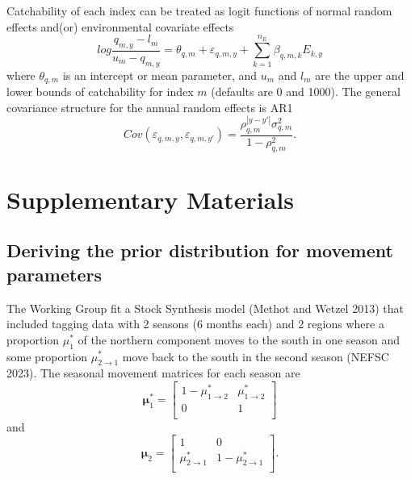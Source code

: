 \documentclass[
]{article}
\begin{document}
Catchability of each index can be treated as logit functions of normal random effects and(or) environmental covariate effects
\begin{equation*}
log \frac{q_{m,y}-l_m}{u_m-q_{m,y}} = \theta_{q,m} + \varepsilon_{q,m,y}  + \sum^{n_E}_{k=1} \beta_{q,m,k} E_{k,y}
\end{equation*}
where \(\theta_{q,m}\) is an intercept or mean parameter, and \(u_{m}\) and \(l_{m}\) are the upper and lower bounds of catchability for index \(m\) (defaults are 0 and 1000). The general covariance structure for the annual random effects is AR1
\begin{equation*}
Cov\left(\varepsilon_{q,m,y},\varepsilon_{q,m,y'}\right) =   \frac{\rho_{q,m}^{|y-y'|}\sigma^2_{q,m}}{1 - \rho_{q,m}^2}.
\end{equation*}

\pagebreak

\hypertarget{supplementary-materials}{%
\section*{Supplementary Materials}\label{supplementary-materials}}

\hypertarget{deriving-the-prior-distribution-for-movement-parameters}{%
\subsection*{Deriving the prior distribution for movement parameters}\label{deriving-the-prior-distribution-for-movement-parameters}}

The Working Group fit a Stock Synthesis model (Methot and Wetzel 2013) that included tagging data with 2 seasons (6 months each) and 2 regions where a proportion \(\mu^*_1\) of the northern component moves to the south in one season and some proportion \(\mu^*_{2\rightarrow 1}\) move back to the south in the second season (NEFSC 2023). The seasonal movement matrices for each season are
\begin{equation*}
\boldsymbol{\mu}^*_{1} = 
  \begin{bmatrix}
     1-\mu^*_{1\rightarrow 2} & \mu^*_{1\rightarrow 2} \\
     0 & 1 \\
  \end{bmatrix}
\end{equation*}
and
\begin{equation*}
\boldsymbol{\mu}_{2} = 
  \begin{bmatrix}
     1 &  0 \\
     \mu^*_{2\rightarrow 1} & 1-\mu^*_{2\rightarrow 1} \\
  \end{bmatrix}.
\end{equation*}
\end{document}

